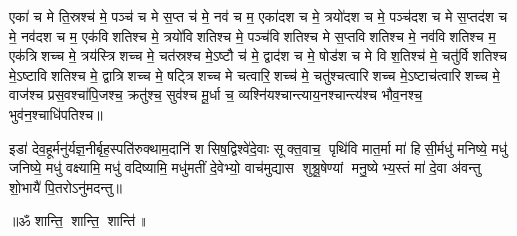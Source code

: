 

एका॑ च मे ति॒स्रश्च॑ मे॒ पञ्च॑ च मे स॒प्त च॑ मे॒ नव॑ च म॒ एका॑दश च मे॒ त्रयो॑दश च मे॒ पञ्च॑दश च मे स॒प्तद॑श च मे॒ नव॑दश च म॒ एक॑विशतिश्च मे॒ त्रयो॑विशतिश्च मे॒ पञ्च॑विशतिश्च मे स॒प्तविशतिश्च मे॒ नव॑विशतिश्च म॒ एक॑त्रिशच्च मे॒ त्रय॑स्त्रिशच्च मे॒ चत॑स्रश्च मे॒ऽष्टौ च॑ मे॒ द्वाद॑श च मे॒ षोड॑श च मे विश॒तिश्च॑ मे॒ चतु॑र्विशतिश्च मे॒ऽष्टाविशतिश्च मे॒ द्वात्रिशच्च मे॒ षट्त्रिशच्च मे चत्वारि॒शच्च॑ मे॒ चतु॑श्चत्वारिशच्च मे॒ऽष्टाच॑त्वारिशच्च मे॒ वाज॑श्च प्रस॒वश्चा॑पि॒जश्च॒ क्रतु॑श्च॒ सुव॑श्च मू॒र्धा च॒ व्यश्नि॑यश्चान्त्याय॒नश्चान्त्य॑श्च भौव॒नश्च॒ भुव॑न॒श्चाधि॑पतिश्च॥ 



\lbrack इडा॑ देव॒हूर्मनु॑र्यज्ञ॒नीर्बृह॒स्पति॑रुक्थाम॒दानि॑ शसिष॒द्विश्वे॑दे॒वाः सूक्त॒वाच॒ पृथि॑वि मात॒र्मा मा॑ हिसी॒र्मधु॑ मनिष्ये॒ मधु॑ जनिष्ये॒ मधु॑ वक्ष्यामि॒ मधु॑ वदिष्यामि॒ मधु॑मतीं दे॒वेभ्यो॒ वाच॑मुद्यास शुश्रू॒षेण्यां मनु॒ष्येभ्य॒स्तं मा॑ दे॒वा अ॑वन्तु शो॒भायै॑ पि॒तरोऽनु॑मदन्तु॥\rbrack

\centerline{॥ॐ शान्ति॒ शान्ति॒ शान्ति॑॥}

{\small \closesection}


